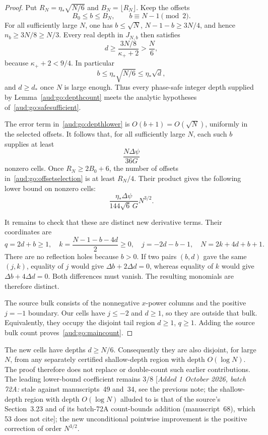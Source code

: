 \documentclass[11pt,a4paper]{article}
\numberwithin{equation}{section}
\newcommand{\addednote}[1]{{\small[\textit{Added 1 October 2026, batch 72A:} #1]}}
\begin{document}
\begin{proof}
Put $R_N=\eta_*\sqrt{N/6}$ and $B_N=\lfloor R_N\rfloor$. Keep the offsets
\begin{equation}\label{aud:go:offsetselection}
 B_0\le b\le B_N,\qquad b\equiv N-1\pmod2.
\end{equation}
For all sufficiently large $N$, one has $b\le\sqrt N$, $N-1-b\ge3N/4$, and hence $n_b\ge3N/8\ge N/3$. Every real depth in $J_{N,b}$ then satisfies
\[
 d\ge\frac{3N/8}{\kappa_++2}>\frac N6,
\]
because $\kappa_++2<9/4$. In particular
\[
 b\le\eta_*\sqrt{N/6}\le\eta_*\sqrt d,
\]
and $d\ge d_*$ once $N$ is large enough. Thus every phase-safe integer depth supplied by Lemma~\ref{aud:go:depthcount} meets the analytic hypotheses of~\eqref{aud:go:safesufficient}.

The error term in~\eqref{aud:go:depthlower} is $O(b+1)=O(\sqrt N)$, uniformly in the selected offsets. It follows that, for all sufficiently large $N$, each such $b$ supplies at least
\[
 \frac{N\Delta\psi}{36G}
\]
nonzero cells. Once $R_N\ge2B_0+6$, the number of offsets in~\eqref{aud:go:offsetselection} is at least $R_N/4$. Their product gives the following lower bound on nonzero cells:
\[
 \frac{\eta_*\Delta\psi}{144\sqrt6\,G}N^{3/2}.
\]

It remains to check that these are distinct new derivative terms. Their coordinates are
\begin{equation}\label{aud:go:bridgecount}
 q=2d+b\ge1,\quad
 k=\frac{N-1-b-4d}{2}\ge0,\quad
 j=-2d-b-1,\quad
 N=2k+4d+b+1.
\end{equation}
There are no reflection holes because $b>0$. If two pairs $(b,d)$ gave the same $(j,k)$, equality of $j$ would give $\Delta b+2\Delta d=0$, whereas equality of $k$ would give $\Delta b+4\Delta d=0$. Both differences must vanish. The resulting monomials are therefore distinct.

The source bulk consists of the nonnegative $x$-power columns and the positive $j=-1$ boundary. Our cells have $j\le-2$ and $d\ge1$, so they are outside that bulk. Equivalently, they occupy the disjoint tail region $d\ge1$, $q\ge1$. Adding the source bulk count proves~\eqref{aud:go:maincount}.
\end{proof}

The new cells have depths $d\ge N/6$. Consequently they are also disjoint, for large $N$, from any separately certified shallow-depth region with depth $O(\log N)$. The proof therefore does not replace or double-count such earlier contributions. The leading lower-bound coefficient remains $3/8$ \addednote{stale against manuscripts~49 and~34, see the previous note; the shallow-depth region with depth $O(\log N)$ alluded to is that of the source\textquoteright s Section~3.23 and of its batch-72A count-bounds addition (manuscript~68), which 53 does not cite}; the new unconditional pointwise improvement is the positive correction of order $N^{3/2}$.
\end{document}

